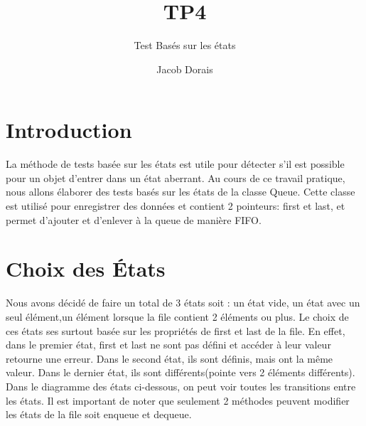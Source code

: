 \documentclass[11pt]{article}
\title{TP4}
\subtitle{Test Basés sur les états}
\author{Jacob Dorais}{Billy Bouchard}{Gr 02}
\begin{document}
\maketitle
\section{Introduction}
La méthode de tests basée sur les états est utile pour détecter s'il est possible pour un objet d'entrer dans un état aberrant.
Au cours de ce travail pratique, nous allons élaborer des tests basés sur les états de la classe Queue.
Cette classe est utilisé pour enregistrer des données et contient 2 pointeurs: first et last, et permet d'ajouter et d'enlever à la queue de manière FIFO.

\section{Choix des États}
Nous avons décidé de faire un total de 3 états soit : un état vide, un état avec un seul élément,un élément lorsque la file contient 2 éléments ou plus.
Le choix de ces états ses surtout basée sur les propriétés de first et last de la file.
En effet, dans le premier état, first et last ne sont pas défini et accéder à leur valeur retourne une erreur.
Dans le second état, ils sont définis, mais ont la même valeur.
Dans le dernier état, ils sont différents(pointe vers 2 éléments différents).
Dans le diagramme des états ci-dessous, on peut voir toutes les transitions entre les états.
Il est important de noter que seulement 2 méthodes peuvent modifier les états de la file soit enqueue et dequeue.
\end{document}
